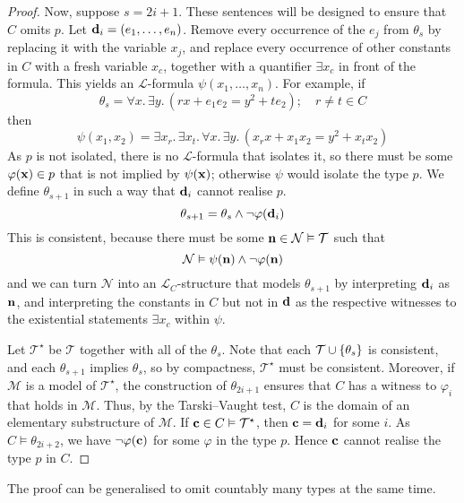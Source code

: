 \begin{proof}
    Now, suppose \( s = 2i + 1 \).
    These sentences will be designed to ensure that \( C \) omits \( p \).
    Let \( \vb d_i = (e_1, \dots, e_n) \).
    Remove every occurrence of the \( e_j \) from \( \theta_s \) by replacing it with the variable \( x_j \), and replace every occurrence of other constants in \( C \) with a fresh variable \( x_c \), together with a quantifier \( \exists x_c \) in front of the formula.
    This yields an \( \mathcal L \)-formula \( \psi(x_1, \dots, x_n) \).
    For example, if
    \[ \theta_s = \forall x.\, \exists y.\, (rx + e_1 e_2 = y^2 + t e_2);\quad r \neq t \in C \]
    then
    \[ \psi(x_1, x_2) = \exists x_r.\, \exists x_t.\, \forall x.\, \exists y.\, (x_r x + x_1 x_2 = y^2 + x_t x_2) \]
    As \( p \) is not isolated, there is no \( \mathcal L \)-formula that isolates it, so there must be some \( \varphi(\vb x) \in p \) that is not implied by \( \psi(\vb x) \); otherwise \( \psi \) would isolate the type \( p \).
    We define \( \theta_{s+1} \) in such a way that \( \vb d_i \) cannot realise \( p \).
    \[ \theta_{s + 1} = \theta_s \wedge \neg \varphi(\vb d_i) \]
    This is consistent, because there must be some \( \vb n \in \mathcal N \vDash \mathcal T \) such that
    \[ \mathcal N \vDash \psi(\vb n) \wedge \neg \varphi(\vb n) \]
    and we can turn \( \mathcal N \) into an \( \mathcal L_C \)-structure that models \( \theta_{s+1} \) by interpreting \( \vb d_i \) as \( \vb n \), and interpreting the constants in \( C \) but not in \( \vb d \) as the respective witnesses to the existential statements \( \exists x_c \) within \( \psi \).

	Let \( \mathcal T^\star \) be \( \mathcal T \) together with all of the \( \theta_s \).
	Note that each \( \mathcal T \cup \qty{\theta_s} \) is consistent, and each \( \theta_{s+1} \) implies \( \theta_s \), so by compactness, \( \mathcal T^\star \) must be consistent.
	Moreover, if \( \mathcal M \) is a model of \( \mathcal T^\star \), the construction of \( \theta_{2i+1} \) ensures that \( C \) has a witness to \( \varphi_i \) that holds in \( \mathcal M \).
	Thus, by the Tarski--Vaught test, \( C \) is the domain of an elementary substructure of \( \mathcal M \).
	If \( \vb c \in C \vDash \mathcal T^\star \), then \( \vb c = \vb d_i \) for some \( i \).
	As \( C \vDash \theta_{2i + 2} \), we have \( \neg \varphi(\vb c) \) for some \( \varphi \) in the type \( p \).
	Hence \( \vb c \) cannot realise the type \( p \) in \( C \).
\end{proof}
\begin{remark}
	The proof can be generalised to omit countably many types at the same time.
\end{remark}

